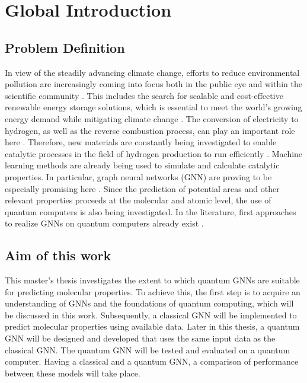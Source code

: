 \chapter{Global Introduction}
\label{chap:Introduction}
\section{Problem Definition}
\label{sec:problemdefinition}
In view of the steadily advancing climate change, efforts to reduce environmental pollution are
increasingly coming into focus both in the public eye and within the scientific community \cite{amin_hydrogen_2022}.
This includes the search for scalable and cost-effective renewable energy storage solutions, which
is essential to meet the world's growing energy demand while mitigating climate change \cite{kilkis_research_2019}. The
conversion of electricity to hydrogen, as well as the reverse combustion process, can play an
important role here \cite{amin_hydrogen_2022}. Therefore, new materials are constantly being investigated to enable
catalytic processes in the field of hydrogen production to run efficiently \cite{chen_waste-derived_2023}. Machine learning
methods are already being used to simulate and calculate catalytic properties. In particular, graph
neural networks (GNN) are proving to be especially promising here \cite{tran_open_2023, bronstein2017geometric}. Since the prediction of
potential areas and other relevant properties proceeds at the molecular and atomic level, the use
of quantum computers is also being investigated. In the literature, first approaches to realize
GNNs on quantum computers already exist \cite{verdon_quantum_2019,beer_quantum_2021,ai_decompositional_2023}.

\section{Aim of this work}
\label{sec:aim}
This master’s thesis investigates the extent to which quantum GNNs are suitable for predicting
molecular properties. To achieve this, the first step is to acquire an understanding of GNNs and
the foundations of quantum computing, which will be discussed in this work. Subsequently, a
classical GNN will be implemented to predict molecular properties using available data. Later in
this thesis, a quantum GNN will be designed and developed that uses the same input data as the
classical GNN. The quantum GNN will be tested and evaluated on a quantum computer. Having a classical and a quantum GNN, a comparison of performance between these models will take place.

